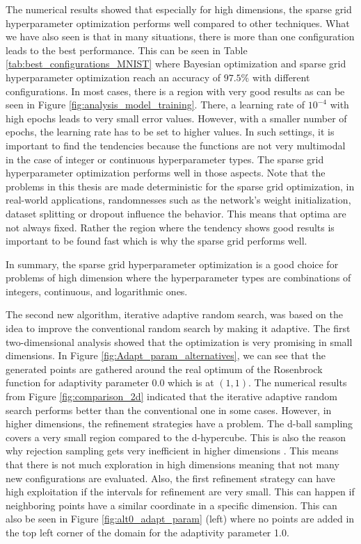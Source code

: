 The numerical results showed that especially for high dimensions, the sparse grid hyperparameter optimization performs well compared to other techniques. What we have also seen is that in many situations, there is more than one configuration leads to the best performance. This can be seen in Table \ref{tab:best_configurations_MNIST} where Bayesian optimization and sparse grid hyperparameter optimization reach an accuracy of $97.5\%$ with different configurations. In most cases, there is a region with very good results as can be seen in Figure \ref{fig:analysis_model_training}. There, a learning rate of $10^{-4} $ with high epochs leads to very small error values. However, with a smaller number of epochs, the learning rate has to be set to higher values. In such settings, it is important to find the tendencies because the functions are not very multimodal in the case of integer or continuous hyperparameter types. The sparse grid hyperparameter optimization performs well in those aspects. Note that the problems in this thesis are made deterministic for the sparse grid optimization, in real-world applications, randomnesses such as the network's weight initialization, dataset splitting or dropout influence the behavior. This means that optima are not always fixed. Rather the region where the tendency shows good results is important to be found fast which is why the sparse grid performs well. 

In summary, the sparse grid hyperparameter optimization is a good choice for problems of high dimension where the hyperparameter types are combinations of integers, continuous, and logarithmic ones. \newline 

The second new algorithm, iterative adaptive random search, was based on the idea to improve the conventional random search by making it adaptive. The first two-dimensional analysis showed that the optimization is very promising in small dimensions. In Figure \ref{fig:Adapt_param_alternatives}, we can see that the generated points are gathered around the real optimum of the Rosenbrock function for adaptivity parameter 0.0 which is at $ (1,1) $. The numerical results from Figure \ref{fig:comparison_2d} indicated that the iterative adaptive random search performs better than the conventional one in some cases. However, in higher dimensions, the refinement strategies have a problem. The d-ball sampling covers a very small region compared to the d-hypercube. This is also the reason why rejection sampling gets very inefficient in higher dimensions \cite{HARMAN20102297}. This means that there is not much exploration in high dimensions meaning that not many new configurations are evaluated. Also, the first refinement strategy can have high exploitation if the intervals for refinement are very small. This can happen if neighboring points have a similar coordinate in a specific dimension. This can also be seen in Figure \ref{fig:alt0_adapt_param} (left) where no points are added in the top left corner of the domain for the adaptivity parameter 1.0.

